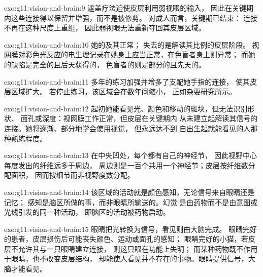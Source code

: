 \begin{solution}{exo:g11:vision-and-brain:9}
遮盖疗法迫使皮层利用弱视眼的输入，
因此在关键期内这些连接得以保留并增强，而不是被修剪。
对成人而言，关键期已结束：
连接不再在这种尺度上重组，
因此弱视眼无法重新夺回其皮层区域。
\end{solution}

\begin{solution}{exo:g11:vision-and-brain:10}
她的及其正常；
失去的是解读其比例的皮层阶段。
视网膜对彩色光反应的电生理记录在她身上应当正常，在色盲者身上则异常；
而她的缺陷是完全的且后天获得的，
色盲者的则是部分的且先天的。
\end{solution}

\begin{solution}{exo:g11:vision-and-brain:11}
多年的练习加强并增多了支配她手指的连接，
使其皮层区域扩大。
若停止练习，该区域会在数年间缩小，
正如杂耍研究所示。
\end{solution}

\begin{solution}{exo:g11:vision-and-brain:12}
起初她能看见光、颜色和移动的斑块，但无法识别形状、
面孔或深度：视网膜工作正常，但皮层在关键期内
从未建立起解读其信号的连接。她将逐渐、部分地学会使用视觉，
但永远达不到
自出生起就能看见的人那种熟练程度。
\end{solution}

\begin{solution}{exo:g11:vision-and-brain:13}
在中央凹处，每个都有自己的神经节，
因此视野中心每度发出的纤维远多于周边，
周边则是一百个共用一个神经节；皮层按纤维数分配面积，
因而按细节而非视野度数分配。
\end{solution}

\begin{solution}{exo:g11:vision-and-brain:14}
该区域的活动就是颜色感知，无论信号来自眼睛还是记忆；
感知是脑区所做的事，而非眼睛所输送的。幻觉
是由药物而不是由意图或光线引发的同一种活动，
即脑区的活动被药物启动。
\end{solution}

\begin{solution}{exo:g11:vision-and-brain:15}
眼睛把光转换为信号，看见则由大脑完成。
眼睛完好的患者，皮层损伤后可能丧失颜色、运动或面孔的感知；
眼睛完好的小猫，若皮层不允许其与一只眼睛建立连接，
则这只眼在功能上失明；
而某种药物既不作用于眼睛，也不改变皮层结构，
却能使人看见并不存在的事物。眼睛提供信号，大脑才能看见。
\end{solution}

